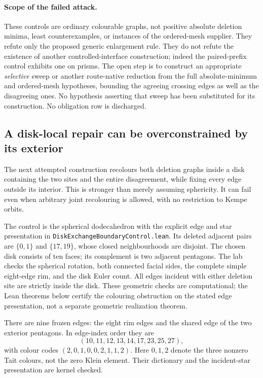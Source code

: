 \paragraph{Scope of the failed attack.}
These controls are ordinary colourable graphs, not positive absolute
deletion minima, least counterexamples, or instances of the ordered-mesh
supplier. They refute only the proposed generic enlargement rule. They
do not refute the existence of another controlled-interface construction;
indeed the paired-prefix control exhibits one on prisms. The open step
is to construct an appropriate \emph{selective} sweep or another
route-native reduction from the full absolute-minimum and ordered-mesh
hypotheses, bounding the agreeing crossing edges as well as the
disagreeing ones. No hypothesis asserting that sweep has been substituted
for its construction. No obligation row is discharged.

\subsection{A disk-local repair can be overconstrained by its exterior}
\label{sec:disk-exchange-boundary-control}

The next attempted construction recolours both deletion graphs inside a
disk containing the two sites and the entire disagreement, while fixing
every edge outside its interior. This is stronger than merely assuming
sphericity. It can fail even when arbitrary joint recolouring is allowed,
with no restriction to Kempe orbits.

The control is the spherical dodecahedron with the explicit edge and star
presentation in \texttt{DiskExchangeBoundaryControl.lean}. Its deleted
adjacent pairs are $\{0,1\}$ and $\{17,19\}$, whose closed neighbourhoods
are disjoint. The chosen disk consists of ten faces; its complement is
two adjacent pentagons. The lab checks the spherical rotation, both
connected facial sides, the complete simple eight-edge rim, and the disk
Euler count. All edges incident with either deletion site are strictly
inside the disk. These geometric checks are computational; the Lean
theorems below certify the colouring obstruction on the stated edge
presentation, not a separate geometric realization theorem.

There are nine frozen edges: the eight rim edges and the shared edge of
the two exterior pentagons. In edge-index order they are
\[
  (10,11,12,13,14,17,23,25,27),
\]
with colour codes $(2,0,1,0,0,2,1,1,2)$. Here $0,1,2$ denote the three
nonzero Tait colours, not the zero Klein element. Their dictionary and
the incident-star presentation are kernel checked.

